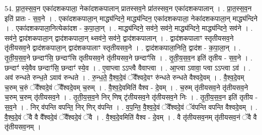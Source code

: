 \documentclass[17pt]{extarticle}
\begin{document}
54. प्रा॒त॒स्स॒व॒न एका॑दशकपाला॒ नेका॑दशकपालान् प्रातस्सव॒ने प्रा॑तस्सव॒न एका॑दशकपालान् । . प्रा॒त॒स्स॒व॒न इति॑ प्रातः - स॒व॒ने । . एका॑दशकपाला॒न् माद्ध्य॑न्दिने॒ माद्ध्य॑न्दिन॒ एका॑दशकपाला॒ नेका॑दशकपाला॒न् माद्ध्य॑न्दिने । . एका॑दशकपाला॒नित्येका॑दश - क॒पा॒ला॒न् । . माद्ध्य॑न्दिने॒ सव॑ने॒ सव॑ने॒ माद्ध्य॑न्दिने॒ माद्ध्य॑न्दिने॒ सव॑ने । . सव॑ने॒ द्वाद॑शकपाला॒न् द्वाद॑शकपाला॒न् थ्सव॑ने॒ सव॑ने॒ द्वाद॑शकपालान् । . द्वाद॑शकपालाꣳ स्तृतीयसव॒ने तृ॑तीयसव॒ने द्वाद॑शकपाला॒न् द्वाद॑शकपालाꣳ स्तृतीयसव॒ने । . द्वाद॑शकपाला॒निति॒ द्वाद॑श - क॒पा॒ला॒न् । . तृ॒ती॒य॒स॒व॒ने छन्दाꣳ॑सि॒ छन्दाꣳ॑सि तृतीयसव॒ने तृ॑तीयसव॒ने छन्दाꣳ॑सि । . तृ॒ती॒य॒स॒व॒न इति॑ तृतीय - स॒व॒ने । . छन्दाꣳ॑ स्ये॒वैव छन्दाꣳ॑सि॒ छन्दाꣳ॑ स्ये॒व । . ए॒वाप्त्वा ऽऽप्त्वै वैवाप्त्वा । . आ॒प्त्वा ऽवावा॒ प्त्वा ऽऽप्त्वा ऽव॑ । . अव॑ रुन्धते रुन्ध॒ते ऽवाव॑ रुन्धते । . रु॒न्ध॒ते॒ वै॒श्व॒दे॒वं ॅवै᳚श्वदे॒वꣳ रु॑न्धते रुन्धते वैश्वदे॒वम् । . वै॒श्व॒दे॒वम् च॒रुम् च॒रुं ॅवै᳚श्वदे॒वं ॅवै᳚श्वदे॒वम् च॒रुम् । . वै॒श्व॒दे॒वमिति॑ वैश्व - दे॒वम् । . च॒रुम् तृ॑तीयसव॒ने तृ॑तीयसव॒ने च॒रुम् च॒रुम् तृ॑तीयसव॒ने । . तृ॒ती॒य॒स॒व॒ने निर् णिष् टृ॑तीयसव॒ने तृ॑तीयसव॒ने निः । . तृ॒ती॒य॒स॒व॒न इति॑ तृतीय - स॒व॒ने । . निर् व॑पन्ति वपन्ति॒ निर् णिर् व॑पन्ति । . व॒प॒न्ति॒ वै॒श्व॒दे॒वं ॅवै᳚श्वदे॒वं ॅव॑पन्ति वपन्ति वैश्वदे॒वम् । . वै॒श्व॒दे॒वं ॅवै वै वै᳚श्वदे॒वं ॅवै᳚श्वदे॒वं ॅवै । . वै॒श्व॒दे॒वमिति॑ वैश्व - दे॒वम् । . वै तृ॑तीयसव॒नम् तृ॑तीयसव॒नं ॅवै वै तृ॑तीयसव॒नम् । \newline
\end{document}
